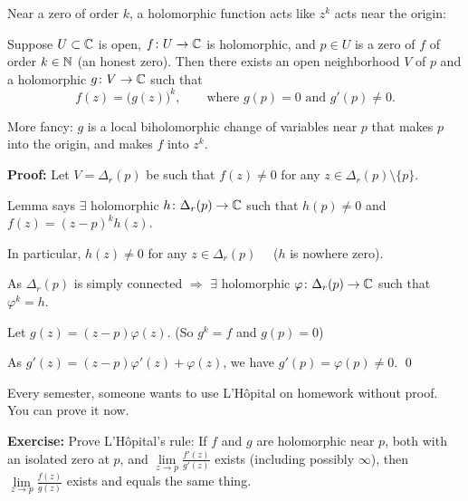 \documentclass[10pt,aspectratio=169]{beamer}
\begin{document}
\begin{frame}

Near a zero of order $k$, a holomorphic function acts like
$z^k$ acts near the origin:

\pause

\begin{theorem}
Suppose $U \subset {\mathbb{C}}$ is open, $f \colon U \to {\mathbb{C}}$ is holomorphic,
and $p \in U$ is a zero of $f$ of order $k \in {\mathbb{N}}$ (an honest zero).
\pause
Then there exists an open neighborhood $V$
of $p$ and a holomorphic $g \colon V \to {\mathbb{C}}$ such that
\[
f(z) = {\bigl( g(z) \bigr)}^k,
\qquad
\text{where $g(p) = 0$ and $g'(p) \not= 0$.}
\]
\end{theorem}

\medskip
\pause

More fancy: $g$ is a local biholomorphic change of variables near
$p$
that makes $p$ into the origin, and makes $f$ into $z^k$.

\medskip
\pause

\textbf{Proof:}
Let $V = \Delta_r(p)$ be such that $f(z) \not= 0$ for any $z \in
\Delta_r(p) \setminus \{ p \}$.

\medskip
\pause

Lemma says $\exists$ holomorphic
$h \colon \Delta_r(p) \to {\mathbb{C}}$ such that
$h(p) \not= 0$ and $f(z) = {(z-p)}^k h(z)$.

\medskip
\pause

In particular,
$h(z) \not= 0$ for any $z \in \Delta_r(p)$ ~~($h$ is nowhere zero).

\medskip
\pause

As
$\Delta_r(p)$ is simply connected
$\Rightarrow$
$\exists$ holomorphic $\varphi \colon \Delta_r(p) \to {\mathbb{C}}$ such that
$\varphi^k = h$.

\medskip
\pause

Let $g(z) = (z-p)\varphi(z)$. \qquad (So $g^k = f$ and $g(p)=0$)

\medskip
\pause

As
$g'(z) = (z-p) \varphi'(z) + \varphi(z)$, we have $g'(p) = \varphi(p) \not= 0$.
\qed
\end{frame}

\begin{frame}

Every semester, someone wants to use L'H\^{o}pital on homework without
proof.  You can prove it now.

\medskip
\pause

\textbf{Exercise:}
Prove L'H\^{o}pital's rule: If $f$ and $g$ are holomorphic near $p$,
both with an isolated zero at $p$, and
$\lim\limits_{z\to p} \frac{f'(z)}{g'(z)}$ exists (including possibly $\infty$), then
$\lim\limits_{z\to p} \frac{f(z)}{g(z)}$ exists and equals the same thing.
\end{frame}
\end{document}
